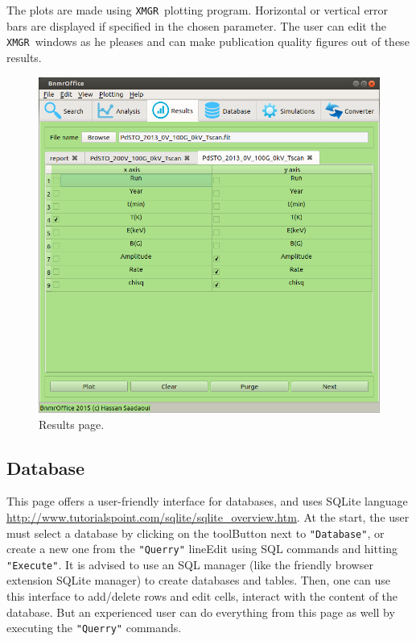 \documentclass[10pt,letterpaper,oneside]{article}
\newcommand{\xmgr}{\texttt{XMGR}}
\begin{document}
The plots are made using \xmgr\ plotting program. Horizontal or vertical error bars are displayed if specified in the chosen parameter. The user can edit the \xmgr\ windows as he pleases and can make publication quality figures out of these results.
\begin{figure}[h]
\center
\includegraphics[width=\textwidth]{results1.png}
 \caption{Results page.}
 \label{fig-results}
 \end{figure}


\newpage
\subsection{Database}
This page offers a user-friendly interface for databases, and
uses SQLite language \url{http://www.tutorialspoint.com/sqlite/sqlite_overview.htm}. At the start, the user must select a database by clicking on the toolButton next to \verb+"Database"+, or create a new one from the \verb+"Querry"+ lineEdit using SQL commands and hitting \verb+"Execute"+.
It is advised to use an SQL manager (like the friendly browser extension SQLite manager) to create databases and tables. Then, one can use this interface to add/delete rows and edit cells, interact with the content of the database. But an experienced user can do everything from this page as well by executing the \verb+"Querry"+ commands.
\end{document}
